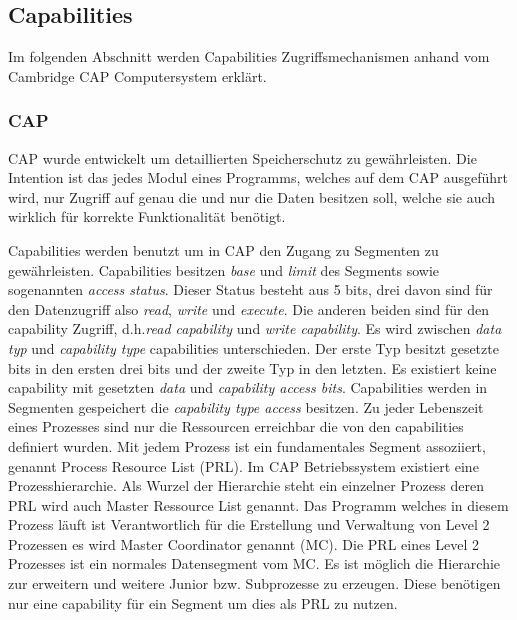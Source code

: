\documentclass[german, 9pt,technote]{IEEEtran}
\begin{document}
    \subsection{Capabilities} \label{sec:secure:capability}
      Im folgenden Abschnitt werden Capabilities Zugriffsmechanismen anhand vom Cambridge CAP Computersystem erkl\"art.
      \subsubsection{CAP}
		     CAP wurde entwickelt um detaillierten Speicherschutz zu gew\"ahrleisten. Die Intention ist das jedes Modul eines Programms,
		     welches auf dem CAP ausgef\"uhrt wird, nur Zugriff auf genau die und nur die Daten besitzen soll,
		     welche sie auch wirklich f\"ur korrekte Funktionalit\"at ben\"otigt.
		     
		     Capabilities werden benutzt um in CAP den Zugang zu Segmenten zu gew\"ahrleisten.
		     Capabilities besitzen \textit{base} und \textit{limit} des Segments sowie sogenannten \textit{access status}. Dieser Status
		     besteht aus 5 bits, drei davon sind f\"ur den Datenzugriff also \textit{read}, \textit{write} und \textit{execute}.
		     Die anderen beiden sind f\"ur den capability Zugriff, d.h.\textit{read capability} und \textit{write capability}.
		     Es wird zwischen \textit{data typ} und \textit{capability type} capabilities unterschieden. Der erste Typ besitzt gesetzte bits in den ersten drei bits 
		     und der zweite Typ in den letzten. Es existiert keine capability mit gesetzten \textit{data} und \textit{capability access bits}.
		     Capabilities werden in Segmenten gespeichert die \textit{capability type access} besitzen.
		     Zu jeder Lebenszeit eines Prozesses sind nur die Ressourcen erreichbar die von den capabilities definiert wurden.
		     Mit jedem Prozess ist ein fundamentales Segment assoziiert, genannt Process Resource List (PRL). 
		     Im CAP Betriebssystem existiert eine Prozesshierarchie. Als Wurzel der Hierarchie steht ein einzelner Prozess deren PRL wird auch Master Ressource List 
		     genannt. Das Programm welches in diesem Prozess l\"auft ist Verantwortlich f\"ur die Erstellung und Verwaltung von Level 2 
		     Prozessen es wird Master Coordinator genannt (MC).
		     Die PRL eines Level 2 Prozesses ist ein normales Datensegment vom MC. Es ist m\"oglich die Hierarchie zur erweitern und weitere Junior
		     bzw. Subprozesse zu erzeugen. Diese ben\"otigen nur eine capability f\"ur ein Segment um dies als PRL zu nutzen.
		     
\end{document}
